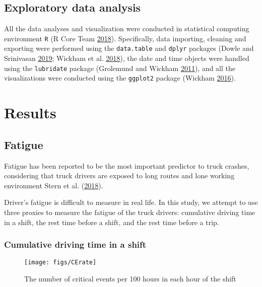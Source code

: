 \documentclass[]{elsarticle} %
\begin{document}
\hypertarget{exploratory-data-analysis}{%
\subsection{Exploratory data analysis}\label{exploratory-data-analysis}}

All the data analyses and visualization were conducted in statistical computing environment \texttt{R} (R Core Team \protect\hyperlink{ref-Rcitation}{2018}). Specifically, data importing, cleaning and exporting were performed using the \texttt{data.table} and \texttt{dplyr} packages (Dowle and Srinivasan \protect\hyperlink{ref-Rdatatable}{2019}; Wickham et al. \protect\hyperlink{ref-Rdplyr}{2018}), the date and time objects were handled using the \texttt{lubridate} package (Grolemund and Wickham \protect\hyperlink{ref-Rlubridate}{2011}), and all the visualizations were conducted using the \texttt{ggplot2} package (Wickham \protect\hyperlink{ref-Rggplot2}{2016}).

\hypertarget{results}{%
\section{Results}\label{results}}

\hypertarget{fatigue}{%
\subsection{Fatigue}\label{fatigue}}

Fatigue has been reported to be the most important predictor to truck crashes, considering that truck drivers are exposed to long routes and lone working environment Stern et al. (\protect\hyperlink{ref-stern2018data}{2018}).

Driver's fatigue is difficult to measure in real life. In this study, we attempt to use three proxies to measure the fatigue of the truck drivers: cumulative driving time in a shift, the rest time before a shift, and the rest time before a trip.

\hypertarget{cumulative-driving-time-in-a-shift}{%
\subsubsection{Cumulative driving time in a shift}\label{cumulative-driving-time-in-a-shift}}

\begin{figure}[!hb]

{\centering \texttt{[image: figs/CErate]} 

}

\caption{The number of critical events per 100 hours in each hour of the shift}\label{fig:unnamed-chunk-1}
\end{figure}
\end{document}
